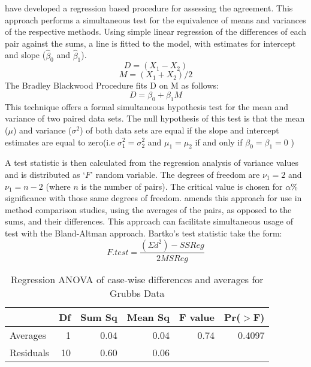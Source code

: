 \documentclass[MAIN.tex]{subfiles}
\begin{document}
	\citet{BB89} have developed a regression based procedure for
	assessing the agreement. This approach performs a simultaneous test for the equivalence of
	means and variances of the respective methods. Using simple linear
	regression of the differences of each pair against the sums, a
	line is fitted to the model, with estimates for intercept and
	slope ($\hat{\beta}_{0}$ and $\hat{\beta}_{1}$).
	\begin{equation}
	D = (X_{1}-X_{2})
	\end{equation}
	\begin{equation}
	M = (X_{1} + X_{2}) /2
	\end{equation}
	The Bradley Blackwood Procedure fits D on M as follows:\\
	\begin{equation}
	D = \beta_{0} + \beta_{1}M
	\end{equation}
	This technique offers a formal simultaneous hypothesis test for the
	mean and variance of two paired data sets.  The null
	hypothesis of this test is that the mean ($\mu$) and variance
	($\sigma^{2}$) of both data sets are equal if the slope and
	intercept estimates are equal to zero(i.e $\sigma^{2}_{1} =
	\sigma^{2}_{2}$ and $\mu_{1}=\mu_{2}$ if and only if $\beta_{0}=
	\beta_{1}=0$ )
	
	A test statistic is then calculated from the regression analysis
	of variance values \citep{BB89} and is distributed as `$F$' random
	variable. The degrees of freedom are $\nu_{1}=2$ and $\nu_{1}=n-2$
	(where $n$ is the number of pairs). The critical value is chosen
	for $\alpha\%$ significance with those same degrees of freedom.
	\citet{Bartko} amends this approach for use in method
	comparison studies, using the averages of the pairs, as opposed to
	the sums, and their differences. This approach can facilitate
	simultaneous usage of test with the Bland-Altman approach.
	Bartko's test statistic take the form:
	\[ F.test = \frac{(\Sigma d^{2})-SSReg}{2MSReg}
	\]
	\begin{table}[h!]
		\begin{center}
			\begin{tabular}{lrrrrr}
				\hline
				& Df & Sum Sq & Mean Sq & F value & Pr($>$F) \\
				\hline
				Averages & 1 & 0.04 & 0.04 & 0.74 & 0.4097 \\
				Residuals & 10 & 0.60 & 0.06 &  &  \\
				\hline
			\end{tabular}
			\caption{Regression ANOVA of case-wise differences and averages
				for Grubbs Data}
		\end{center}
	\end{table}
	
\end{document}
